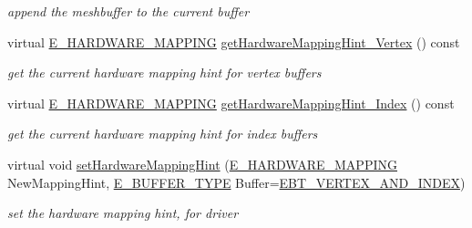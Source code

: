 \begin{DoxyCompactItemize}
\begin{DoxyCompactList}\small\item\em append the meshbuffer to the current buffer \end{DoxyCompactList}\item 
\mbox{\label{structirr_1_1scene_1_1SSkinMeshBuffer_a1f969cf6a394f4dce500ba446e150c88}} 
virtual \hyperlink{namespaceirr_1_1scene_ac7d8ee8d77da75f2580bb9bb17231c27}{E\+\_\+\+H\+A\+R\+D\+W\+A\+R\+E\+\_\+\+M\+A\+P\+P\+I\+NG} \hyperlink{structirr_1_1scene_1_1SSkinMeshBuffer_a1f969cf6a394f4dce500ba446e150c88}{get\+Hardware\+Mapping\+Hint\+\_\+\+Vertex} () const
\begin{DoxyCompactList}\small\item\em get the current hardware mapping hint for vertex buffers \end{DoxyCompactList}\item 
\mbox{\label{structirr_1_1scene_1_1SSkinMeshBuffer_a3f1c1c7652af10b2de87ae24ff2989ff}} 
virtual \hyperlink{namespaceirr_1_1scene_ac7d8ee8d77da75f2580bb9bb17231c27}{E\+\_\+\+H\+A\+R\+D\+W\+A\+R\+E\+\_\+\+M\+A\+P\+P\+I\+NG} \hyperlink{structirr_1_1scene_1_1SSkinMeshBuffer_a3f1c1c7652af10b2de87ae24ff2989ff}{get\+Hardware\+Mapping\+Hint\+\_\+\+Index} () const
\begin{DoxyCompactList}\small\item\em get the current hardware mapping hint for index buffers \end{DoxyCompactList}\item 
\mbox{\label{structirr_1_1scene_1_1SSkinMeshBuffer_abee3db2badc118f0024a75eb86bc823b}} 
virtual void \hyperlink{structirr_1_1scene_1_1SSkinMeshBuffer_abee3db2badc118f0024a75eb86bc823b}{set\+Hardware\+Mapping\+Hint} (\hyperlink{namespaceirr_1_1scene_ac7d8ee8d77da75f2580bb9bb17231c27}{E\+\_\+\+H\+A\+R\+D\+W\+A\+R\+E\+\_\+\+M\+A\+P\+P\+I\+NG} New\+Mapping\+Hint, \hyperlink{namespaceirr_1_1scene_a8f59a89ffef0ad8e5b2c2cb874a93e8c}{E\+\_\+\+B\+U\+F\+F\+E\+R\+\_\+\+T\+Y\+PE} Buffer=\hyperlink{namespaceirr_1_1scene_a8f59a89ffef0ad8e5b2c2cb874a93e8ca833624730c30cffccc121fe31aa0832c}{E\+B\+T\+\_\+\+V\+E\+R\+T\+E\+X\+\_\+\+A\+N\+D\+\_\+\+I\+N\+D\+EX})
\begin{DoxyCompactList}\small\item\em set the hardware mapping hint, for driver \end{DoxyCompactList}\item 

\end{DoxyCompactItemize}
